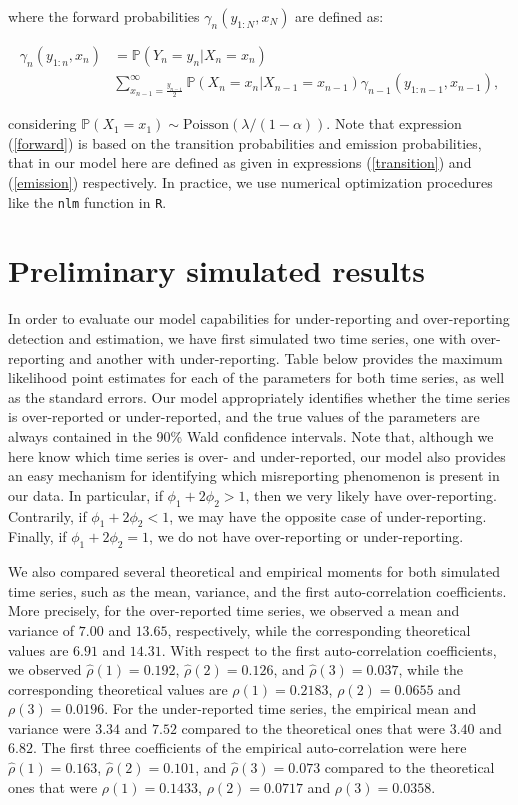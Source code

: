 \documentclass[12pt,twoside, A4paper]{article}
\begin{document}
where the forward probabilities $\gamma_n\left(y_{1:N},x_N\right)$ are defined as:

\begin{align}\label{forward}
\gamma_n(y_{1:n},x_n) &= \mathbb{P}(Y_n=y_n|X_n=x_n) \nonumber \\ & \sum_{x_{n-1}=\frac{y_{n-1}}{2}}^{\infty}\mathbb{P}(X_n=x_n|X_{n-1}=x_{n-1}) \gamma_{n-1}(y_{1:n-1},x_{n-1}), 
\end{align}

considering $\mathbb{P}(X_1=x_1) \sim \textrm{Poisson}(\lambda/(1-\alpha))$. Note that expression (\ref{forward}) is based on the transition probabilities and emission probabilities, that in our model here are defined as given in expressions (\ref{transition}) and (\ref{emission}) respectively. In practice, we use numerical optimization procedures like the \texttt{nlm} function in \texttt{R}. 

\section{Preliminary simulated results}

In order to evaluate our model capabilities for under-reporting and over-reporting detection and estimation, we have first simulated two time series, one with over-reporting and another with under-reporting. Table below provides the maximum likelihood point estimates for each of the parameters for both time series, as well as the standard errors. Our model appropriately identifies whether the time series is over-reported or under-reported, and the true values of the parameters are always contained in the 90\% Wald confidence intervals. Note that, although we here know which time series is over- and under-reported, our model also provides an easy mechanism for identifying which misreporting phenomenon is present in our data. In particular, if $\phi_1+2\phi_2>1$, then we very likely have over-reporting. Contrarily, if $\phi_1+2\phi_2<1$, we may have the opposite case of under-reporting. Finally, if $\phi_1+2\phi_2=1$, we do not have over-reporting or under-reporting.

We also compared several theoretical and empirical moments for both simulated time series, such as the mean, variance, and the first auto-correlation coefficients. More precisely, for the over-reported time series, we observed a mean and variance of $7.00$ and $13.65$, respectively, while the corresponding theoretical values are $6.91$ and $14.31$. With respect to the first auto-correlation coefficients, we observed ${\hat \rho}(1)=0.192$, ${\hat \rho}(2)=0.126$, and ${\hat \rho}(3)=0.037$, while the corresponding theoretical values are $\rho(1)=0.2183$, $\rho(2)=0.0655$ and $\rho(3)=0.0196$. For the under-reported time series, the empirical mean and variance were $3.34$ and $7.52$ compared to the theoretical ones that were $3.40$ and $6.82$. The first three coefficients of the empirical auto-correlation were here ${\hat \rho}(1)=0.163$, ${\hat \rho}(2)=0.101$, and ${\hat \rho}(3)=0.073$ compared to the theoretical ones that were  $\rho(1)=0.1433$, $\rho(2)=0.0717$ and $\rho(3)=0.0358$. 
\end{document}
